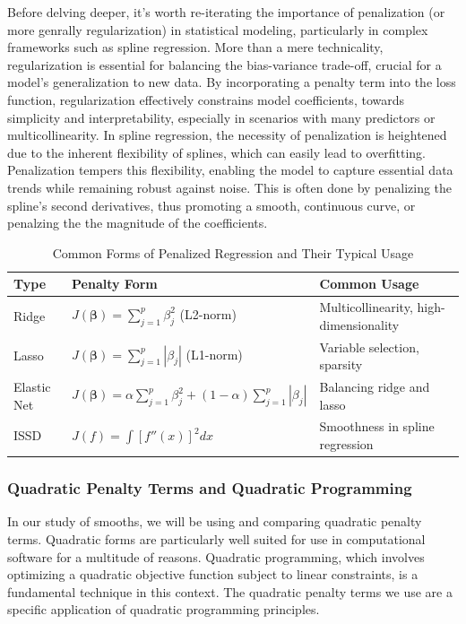 \documentclass[12pt, twoside,hidelinks]{article}
\theoremstyle{definition}
\numberwithin{equation}{section}
\begin{document}
Before delving deeper, it's worth re-iterating the importance of penalization (or more genrally regularization) in statistical modeling, particularly in complex frameworks such as spline regression. More than a mere technicality, regularization is essential for balancing the bias-variance trade-off, crucial for a model's generalization to new data. By incorporating a penalty term into the loss function, regularization effectively constrains model coefficients, towards simplicity and interpretability, especially in scenarios with many predictors or multicollinearity. In spline regression, the necessity of penalization is heightened due to the inherent flexibility of splines, which can easily lead to overfitting. Penalization tempers this flexibility, enabling the model to capture essential data trends while remaining robust against noise. This is often done by penalizing the spline's second derivatives, thus promoting a smooth, continuous curve, or penalzing the the magnitude of the coefficients. 
\newline

\begin{table}[H]
\centering
\begin{tabular}{|l|l|l|}
\hline
\textbf{Type} & \textbf{Penalty Form} & \textbf{Common Usage} \\ \hline
Ridge & \( J(\boldsymbol{\beta}) = \sum_{j=1}^{p} \beta_j^2 \) (L2-norm) & Multicollinearity, high-dimensionality \\ \hline
Lasso & \( J(\boldsymbol{\beta}) = \sum_{j=1}^{p} |\beta_j| \) (L1-norm) & Variable selection, sparsity \\ \hline
Elastic Net & \( J(\boldsymbol{\beta}) = \alpha \sum_{j=1}^{p} \beta_j^2 + (1-\alpha) \sum_{j=1}^{p} |\beta_j| \) & Balancing ridge and lasso \\ \hline
ISSD & \( J(f) = \int [f''(x)]^2 dx \) & Smoothness in spline regression \\ \hline
\end{tabular}
\caption{Common Forms of Penalized Regression and Their Typical Usage}
\label{tab:penalized_regression}
\end{table}




\subsubsection{Quadratic Penalty Terms and Quadratic Programming}

In our study of smooths, we will be using and comparing quadratic penalty terms. Quadratic forms are particularly well suited for use in computational software for a multitude of reasons. Quadratic programming, which involves optimizing a quadratic objective function subject to linear constraints, is a fundamental technique in this context. The quadratic penalty terms we use are a specific application of quadratic programming principles.
\end{document}
